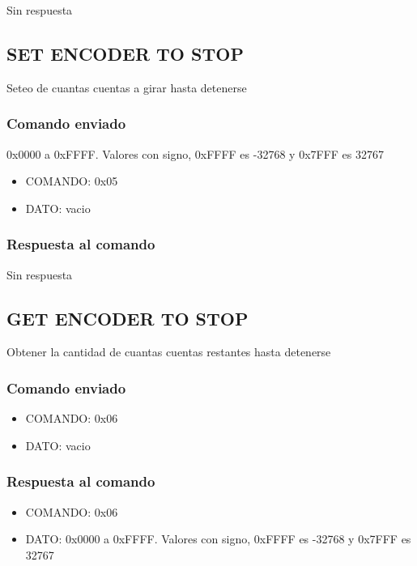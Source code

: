 \documentclass[a4paper,11pt]{article}
\begin{document}
Sin respuesta

\subsection{SET ENCODER TO STOP}
\label{set_encoder_to_stop}

Seteo de cuantas cuentas a girar hasta detenerse

\subsubsection*{Comando enviado}
\label{set_encoder_to_stop_comando_enviado}

0x0000 a 0xFFFF. Valores con signo, 0xFFFF es -32768 y 0x7FFF es 32767

\begin{itemize}
	\item{COMANDO:} 0x05
	\item{DATO:} vacio
\end{itemize}

\subsubsection*{Respuesta al comando}
\label{set_encoder_to_stop_respuesta}

Sin respuesta

\subsection{GET ENCODER TO STOP}
\label{get_encoder_to_stop}

Obtener la cantidad de cuantas cuentas restantes hasta detenerse

\subsubsection*{Comando enviado}
\label{get_encoder_to_stop_comando_enviado}

\begin{itemize}
	\item{COMANDO:} 0x06
	\item{DATO:} vacio
\end{itemize}

\subsubsection*{Respuesta al comando}
\label{get_encoder_to_stop_respuesta}

\begin{itemize}
	\item{COMANDO:} 0x06
	\item{DATO:} 0x0000 a 0xFFFF. Valores con signo, 0xFFFF es -32768 y 0x7FFF es 32767
\end{itemize}
\end{document}

